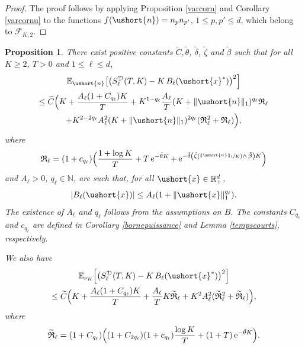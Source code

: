\documentclass[11pt]{article}
\newcommand{\Psfrac}[2]{(\sfrac{#1}{#2})}
\newcommand{\scaleto}[2]{#1}
\numberwithin{equation}{section}
\theoremstyle{plain}
\newtheorem{proposition}[theorem]{Proposition}
\theoremstyle{definition}
\newcommand{\E}{{\mathbb{E}}}
\newcommand{\integers}{\mathbb{N}}
\newcommand{\rpd}{\mathbb{R}_+^d}
\newcommand{\sK}{K}
\newcommand{\vecn}{\ushort{n}}
\newcommand{\vecxf}{\ushort{x}^*}
\newcommand{\vecx}{\ushort{x}}
\newcommand{\e}{\operatorname{e}}
\newcommand{\norm}[1]{\|#1\|_{1}}\let\snorm\norm
\begin{document}
\begin{proof}
The proof follows by applying Proposition \ref{varcorn} and Corollary \ref{varcornu} to the functions
$f(\vecn)=n_p n_{p'}$, $1\leq p,p' \leq d$, which belong to $\mathscr{F}\!_{\sK,2}$.
\end{proof}

\begin{proposition}
There exist positive constants $\widetilde{C}, \tilde{\theta}$, $\tilde{\delta}$, $\tilde{\zeta}$ and $\tilde{\beta}$ such that for all $K\geq 2$, $T>0$ and $1\leq \ell\leq d$,
\begin{multline*}
\E_{\vecn}\bigl[\bigl(S^{{ \EuScript{D}}}_{\ell}(T,K)-K\,B_{\ell}(\vecxf)\bigr)^2\Bigr]\\
\le\widetilde{C} \Bigl(
K + \frac{A_\ell (1+C_{q_\ell}) K}{T} + K^{1-q_\ell} \frac{A_\ell}{T} (K+\norm{\vecn})^{q_\ell} \mathfrak{R}_\ell \\
+ K^{{2}-{2}q_\ell} A_\ell^2
(K+\norm{\vecn})^{2q_\ell}(\mathfrak{R}_\ell^2+\mathfrak{R}_\ell)
\Bigr),
\end{multline*}
where
\[
\mathfrak{R}_\ell=
(1+c_{q_\ell}) \Bigl(\frac{1+\log K}{T} + T \e^{-\tilde{\theta} K}
+ \e^{-\tilde{\delta}\left(\tilde{\zeta}\Psfrac{\|\vecn\|_{1}}{K}\wedge\, \tilde{\beta}\right)K} \Bigr)
\]
and $A_\ell>0$, $q_\ell\in\integers$, are such that, for all $\vecx \in \rpd$,
\[
|B_\ell(\vecx)|\leq A_\ell (1+ \norm{\vecx}^{\scaleto{q_\ell}{3.6pt}}).
\]
The existence of $A_\ell$ and $q_\ell$ follows from the assumptions on $B$. The constants $C_{q_\ell}$ and $c_{q_\ell}$ are
defined in Corollary \ref{bornepuissance} and Lemma \ref{tempscourts}, respectively.

We also have
\begin{multline*}
\E_{\snuk} \Bigl[\bigl(S^{{ \EuScript{D}}}_{\ell}(T,K)-K\,B_{\ell}(\vecxf)\bigr)^2 \Bigr]\\
\le
\widetilde{C} \Bigl(K + \frac{A_\ell (1+C_{q_\ell}) K}{T} + \frac{A_\ell}{T} K \widetilde{\mathfrak{R}}_\ell +
K^2 A_\ell^2 (\widetilde{\mathfrak{R}}_\ell^2+\widetilde{\mathfrak{R}}_\ell) \Bigr),
\end{multline*}
where
\[
\widetilde{\mathfrak{R}}_\ell=(1+C_{q_\ell}) \Bigl((1+C_{2q_\ell})(1+c_{q_\ell})\frac{\log K}{T} +(1+T) \e^{-\tilde{\theta} K} \Bigr).
\]
\end{proposition}
\end{document}
